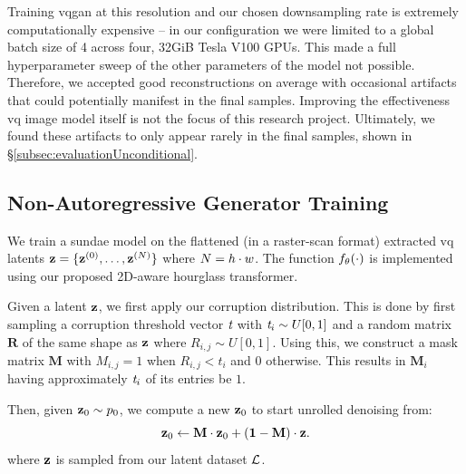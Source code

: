 Training \gls{vqgan} at this resolution and our chosen downsampling rate is
extremely computationally expensive -- in our configuration we were limited to a
global batch size of 4 across four, 32GiB Tesla V100 GPUs. This made a full
hyperparameter sweep of the other parameters of the model not possible.
Therefore, we accepted good reconstructions on average with occasional
artifacts that could potentially manifest in the final samples. Improving the
effectiveness \gls{vq} image model itself is not the focus of this research
project. Ultimately, we found these artifacts to only appear rarely in the final
samples, shown in \S\ref{subsec:evaluationUnconditional}.

\subsection{Non-Autoregressive Generator Training}
\label{subsec:sundaeTraining}

We train a \gls{sundae} model on the flattened (in a raster-scan format)
extracted \gls{vq} latents $\mathbf{z} = \{\mathbf{z}^{(0)}, \dots, \mathbf{z}^{(N)}\}$
where $N = h \cdot w$. The function $f_\theta(\cdot)$ is
implemented using our proposed 2D-aware hourglass transformer. 

Given a latent $\mathbf{z}$, we first apply our corruption distribution. This is
done by first sampling a corruption threshold vector $\textit{t}$ with
$\textit{t}_i \sim U[0, 1]$ and a random matrix $\mathbf{R}$ of the
same shape as $\mathbf{z}$ where $R_{i,j} \sim U[0,1]$. Using this, we construct a
mask matrix $\mathbf{M}$ with $M_{i,j} = 1$ when $R_{i,j} < t_i$ and $0$
otherwise. This results in $\mathbf{M}_i$ having approximately
$\textit{t}_i$ of its entries be $1$.

Then, given $\mathbf{z}_0 \sim p_0$, we compute a new $\mathbf{z}_0$ to start unrolled
denoising from:
\begin{equation}
    \mathbf{z}_0 \leftarrow \mathbf{M} \cdot \mathbf{z}_0 + (\mathbf{1} - \mathbf{M})
    \cdot \mathbf{z} \text{.}
\end{equation}
where $\mathbf{z}$ is sampled from our latent dataset $\mathcal{L}$.

